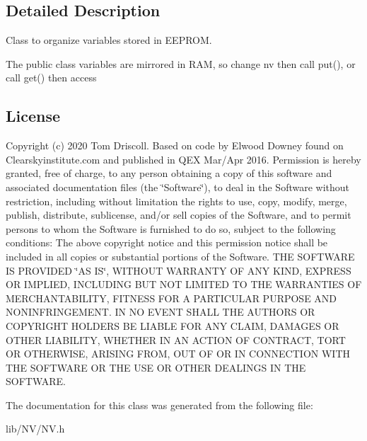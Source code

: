 \subsection{Detailed Description}
Class to organize variables stored in E\+E\+P\+R\+OM. 

The public class variables are mirrored in R\+AM, so change nv then call put(), or call get() then access\hypertarget{main_8cpp_license}{}\subsection{License}\label{main_8cpp_license}
Copyright (c) 2020 Tom Driscoll. Based on code by Elwood Downey found on Clearskyinstitute.\+com and published in Q\+EX Mar/\+Apr 2016. Permission is hereby granted, free of charge, to any person obtaining a copy of this software and associated documentation files (the \char`\"{}\+Software\char`\"{}), to deal in the Software without restriction, including without limitation the rights to use, copy, modify, merge, publish, distribute, sublicense, and/or sell copies of the Software, and to permit persons to whom the Software is furnished to do so, subject to the following conditions\+: The above copyright notice and this permission notice shall be included in all copies or substantial portions of the Software. T\+HE S\+O\+F\+T\+W\+A\+RE IS P\+R\+O\+V\+I\+D\+ED \char`\"{}\+A\+S I\+S\char`\"{}, W\+I\+T\+H\+O\+UT W\+A\+R\+R\+A\+N\+TY OF A\+NY K\+I\+ND, E\+X\+P\+R\+E\+SS OR I\+M\+P\+L\+I\+ED, I\+N\+C\+L\+U\+D\+I\+NG B\+UT N\+OT L\+I\+M\+I\+T\+ED TO T\+HE W\+A\+R\+R\+A\+N\+T\+I\+ES OF M\+E\+R\+C\+H\+A\+N\+T\+A\+B\+I\+L\+I\+TY, F\+I\+T\+N\+E\+SS F\+OR A P\+A\+R\+T\+I\+C\+U\+L\+AR P\+U\+R\+P\+O\+SE A\+ND N\+O\+N\+I\+N\+F\+R\+I\+N\+G\+E\+M\+E\+NT. IN NO E\+V\+E\+NT S\+H\+A\+LL T\+HE A\+U\+T\+H\+O\+RS OR C\+O\+P\+Y\+R\+I\+G\+HT H\+O\+L\+D\+E\+RS BE L\+I\+A\+B\+LE F\+OR A\+NY C\+L\+A\+IM, D\+A\+M\+A\+G\+ES OR O\+T\+H\+ER L\+I\+A\+B\+I\+L\+I\+TY, W\+H\+E\+T\+H\+ER IN AN A\+C\+T\+I\+ON OF C\+O\+N\+T\+R\+A\+CT, T\+O\+RT OR O\+T\+H\+E\+R\+W\+I\+SE, A\+R\+I\+S\+I\+NG F\+R\+OM, O\+UT OF OR IN C\+O\+N\+N\+E\+C\+T\+I\+ON W\+I\+TH T\+HE S\+O\+F\+T\+W\+A\+RE OR T\+HE U\+SE OR O\+T\+H\+ER D\+E\+A\+L\+I\+N\+GS IN T\+HE S\+O\+F\+T\+W\+A\+RE. 

The documentation for this class was generated from the following file\+:\begin{DoxyCompactItemize}
\item 
lib/\+N\+V/N\+V.\+h\end{DoxyCompactItemize}
